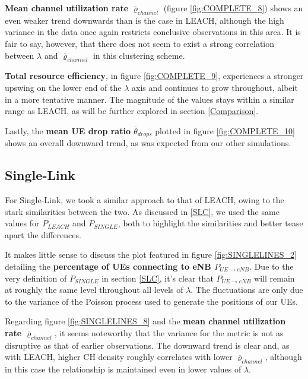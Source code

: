 \textbf{Mean channel utilization rate} $\overline{\varrho}_{channel}$ (figure \ref{fig:COMPLETE_8}) shows an even weaker trend downwards than is the case in LEACH, although the high variance in the data once again restricts conclusive observations in this area. It is fair to say, however, that there does not seem to exist a strong correlation between $\lambda$ and $\overline{\varrho}_{channel}$ in this clustering scheme.

\textbf{Total resource efficiency}, in figure \ref{fig:COMPLETE_9}, experiences a stronger upswing on the lower end of the $\lambda$ axis and continues to grow throughout, albeit in a more tentative manner. The magnitude of the values stays within a similar range as LEACH, as will be further explored in section \ref{Comparison}.

Lastly, the \textbf{mean UE drop ratio $\overline{\theta}_{drops}$} plotted in figure \ref{fig:COMPLETE_10} shows an overall downward trend, as was expected from our other simulations.

\subsection{Single-Link}\label{description:SINGLE}

For Single-Link, we took a similar approach to that of LEACH, owing to the stark similarities between the two. As discussed in \ref{SLC}, we used the same values for $P_{LEACH}$ and $P_{SINGLE}$, both to highlight the similarities and better tease apart the differences.

It makes little sense to discuss the plot featured in figure \ref{fig:SINGLELINES_2} detailing the \textbf{percentage of UEs connecting to eNB $P_{UE\rightarrow eNB}$}. Due to the very definition of $P_{SINGLE}$ in section \ref{SLC}, it's clear that $P_{UE\rightarrow eNB}$ will remain at roughly the same level throughout all levels of $\lambda$. The fluctuations are only due to the variance of the Poisson process used to generate the positions of our UEs.

Regarding figure \ref{fig:SINGLELINES_8} and the \textbf{mean channel utilization rate $\overline{\varrho}_{channel}$}, it seems noteworthy that the variance for the metric is not as disruptive as that of earlier observations. The downward trend is clear and, as with LEACH, higher CH density roughly correlates with lower $\overline{\varrho}_{channel}$, although in this case the relationship is maintained even in lower values of $\lambda$.

